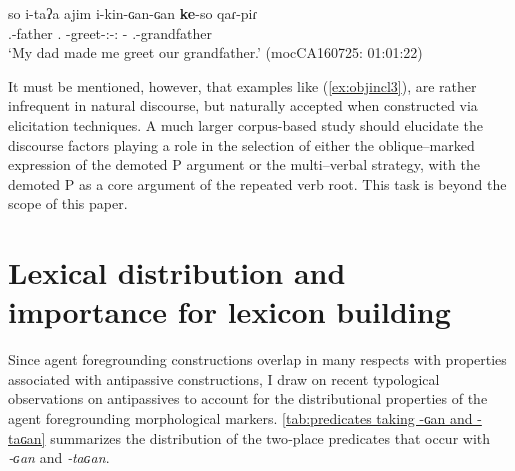\documentclass[12pt]{article}
\begin{document}
\begin{exe}
\ex 
	 \gll so i-taʔa ajim i-kin-ɢan-ɢan \textbf{ke}-so qaɾ-piɾ     \\
			 {\DetTwo} {\First\Sg.\Poss}-father {\First\Sg.\Pron} {\Third\II}-greet-{\Vm:\Intr}-{\Vm:\Tr} {\Obl}-{\DetTwo} {\First\Pl.\Poss}-grandfather\\
	\trans `My dad made me greet our grandfather.' \hfill (mocCA160725: 01:01:22) \label{ex:objincl3}
\end{exe}
 
It must be mentioned, however, that examples like (\ref{ex:objincl3}), are rather infrequent in natural discourse, but naturally accepted when constructed via elicitation techniques. A much larger corpus-based study should elucidate the discourse factors playing a role in the selection of either the oblique--marked expression of the demoted P argument or the multi--verbal strategy, with the demoted P as a core argument of the repeated verb root. This task is beyond the scope of this paper. 

\section{Lexical distribution and importance for lexicon building}\label{sec:lexicon_distribution}
Since agent foregrounding constructions overlap in many respects with properties associated with antipassive constructions, I draw on recent typological observations on antipassives to account for the distributional properties of the agent foregrounding morphological markers. \autoref{tab:predicates taking -ɢan and -taɢan} summarizes the distribution of the two‑place predicates that occur with \textit{‑ɢan} and \textit{‑taɢan}.
\end{document}
